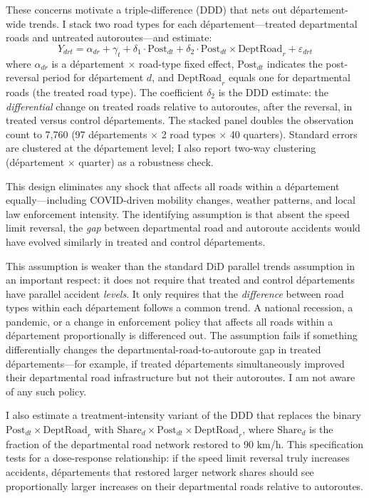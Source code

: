 \documentclass[12pt]{article}
\begin{document}
These concerns motivate a triple-difference (DDD) that nets out d\'{e}partement-wide trends. I stack two road types for each d\'{e}partement---treated departmental roads and untreated autoroutes---and estimate:
\begin{equation}
Y_{drt} = \alpha_{dr} + \gamma_t + \delta_1 \cdot \text{Post}_{dt} + \delta_2 \cdot \text{Post}_{dt} \times \text{DeptRoad}_r + \varepsilon_{drt}
\label{eq:ddd}
\end{equation}
where $\alpha_{dr}$ is a d\'{e}partement $\times$ road-type fixed effect, $\text{Post}_{dt}$ indicates the post-reversal period for d\'{e}partement $d$, and $\text{DeptRoad}_r$ equals one for departmental roads (the treated road type). The coefficient $\delta_2$ is the DDD estimate: the \textit{differential} change on treated roads relative to autoroutes, after the reversal, in treated versus control d\'{e}partements. The stacked panel doubles the observation count to 7,760 (97 d\'{e}partements $\times$ 2 road types $\times$ 40 quarters). Standard errors are clustered at the d\'{e}partement level; I also report two-way clustering (d\'{e}partement $\times$ quarter) as a robustness check.

This design eliminates any shock that affects all roads within a d\'{e}partement equally---including COVID-driven mobility changes, weather patterns, and local law enforcement intensity. The identifying assumption is that absent the speed limit reversal, the \textit{gap} between departmental road and autoroute accidents would have evolved similarly in treated and control d\'{e}partements.

This assumption is weaker than the standard DiD parallel trends assumption in an important respect: it does not require that treated and control d\'{e}partements have parallel accident \textit{levels}. It only requires that the \textit{difference} between road types within each d\'{e}partement follows a common trend. A national recession, a pandemic, or a change in enforcement policy that affects all roads within a d\'{e}partement proportionally is differenced out. The assumption fails if something differentially changes the departmental-road-to-autoroute gap in treated d\'{e}partements---for example, if treated d\'{e}partements simultaneously improved their departmental road infrastructure but not their autoroutes. I am not aware of any such policy.

I also estimate a treatment-intensity variant of the DDD that replaces the binary $\text{Post}_{dt} \times \text{DeptRoad}_r$ with $\text{Share}_{d} \times \text{Post}_{dt} \times \text{DeptRoad}_r$, where $\text{Share}_{d}$ is the fraction of the departmental road network restored to 90 km/h. This specification tests for a dose-response relationship: if the speed limit reversal truly increases accidents, d\'{e}partements that restored larger network shares should see proportionally larger increases on their departmental roads relative to autoroutes.
\end{document}
